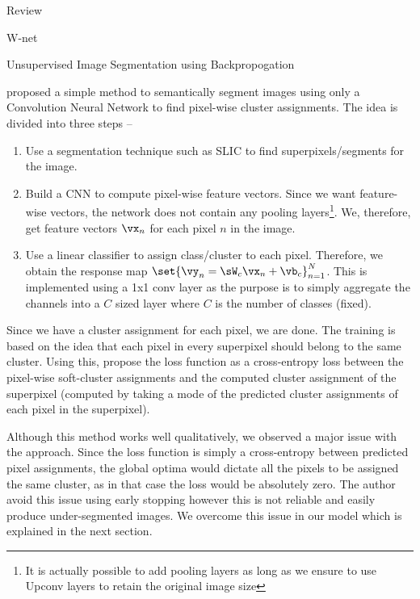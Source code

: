\documentclass{article}
\begin{document}
\begin{ssection}{Review}
\begin{ssubsection}{W-net}
	\end{ssubsection}

	\begin{ssubsection}{Unsupervised Image Segmentation using Backpropogation}

		\cite{backprop} proposed a simple method to semantically segment images using only a Convolution Neural Network to find pixel-wise cluster assignments. The idea is divided into three steps --
		\begin{enumerate}
			\item Use a segmentation technique such as SLIC to find superpixels/segments for the image.
			\item Build a CNN to compute pixel-wise feature vectors. Since we want feature-wise vectors, the network does not contain any pooling layers\footnote{It is actually possible to add pooling layers as long as we ensure to use Upconv layers to retain the original image size}. We, therefore, get feature vectors $\vx_n$ for each pixel $n$ in the image.
			\item Use a linear classifier to assign class/cluster to each pixel. Therefore, we obtain the response map $\set{\vy_n = \sW_c \vx_n + \vb_c}_{n = 1}^{N}$. This is implemented using a 1x1 conv layer as the purpose is to simply aggregate the channels into a $C$ sized layer where $C$ is the number of classes (fixed).
		\end{enumerate}

		Since we have a cluster assignment for each pixel, we are done. The training is based on the idea that each pixel in every superpixel should belong to the same cluster. Using this, \cite{backprop} propose the loss function as a cross-entropy loss between the pixel-wise soft-cluster assignments and the computed cluster assignment of the superpixel (computed by taking a mode of the predicted cluster assignments of each pixel in the superpixel).

		Although this method works well qualitatively, we observed a major issue with the approach. Since the loss function is simply a cross-entropy between predicted pixel assignments, the global optima would dictate all the pixels to be assigned the same cluster, as in that case the loss would be absolutely zero. The author avoid this issue using early stopping however this is not reliable and easily produce under-segmented images. We overcome this issue in our model which is explained in the next section.
	\end{ssubsection}

\end{ssection}
\end{document}
